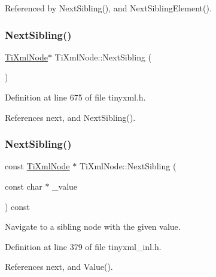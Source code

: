 Referenced by Next\+Sibling(), and Next\+Sibling\+Element().

\hypertarget{class_ti_xml_node_a4d05f7b1d7b470ac6887edd072d4892a}{}\label{class_ti_xml_node_a4d05f7b1d7b470ac6887edd072d4892a} 
\subsubsection{\texorpdfstring{Next\+Sibling()}{NextSibling()}\hspace{0.1cm}{\footnotesize\ttfamily [4/6]}}
{\footnotesize\ttfamily \hyperlink{class_ti_xml_node}{Ti\+Xml\+Node}$\ast$ Ti\+Xml\+Node\+::\+Next\+Sibling (\begin{DoxyParamCaption}{ }\end{DoxyParamCaption})\hspace{0.3cm}{\ttfamily [inline]}}



Definition at line 675 of file tinyxml.\+h.



References next, and Next\+Sibling().

\hypertarget{class_ti_xml_node_a0864ea784b53cdca0a37829d3391ca4b}{}\label{class_ti_xml_node_a0864ea784b53cdca0a37829d3391ca4b} 
\subsubsection{\texorpdfstring{Next\+Sibling()}{NextSibling()}\hspace{0.1cm}{\footnotesize\ttfamily [5/6]}}
{\footnotesize\ttfamily const \hyperlink{class_ti_xml_node}{Ti\+Xml\+Node} $\ast$ Ti\+Xml\+Node\+::\+Next\+Sibling (\begin{DoxyParamCaption}\item[{const char $\ast$}]{\+\_\+value }\end{DoxyParamCaption}) const}



Navigate to a sibling node with the given \textquotesingle{}value\textquotesingle{}. 



Definition at line 379 of file tinyxml\+\_\+inl.\+h.



References next, and Value().

